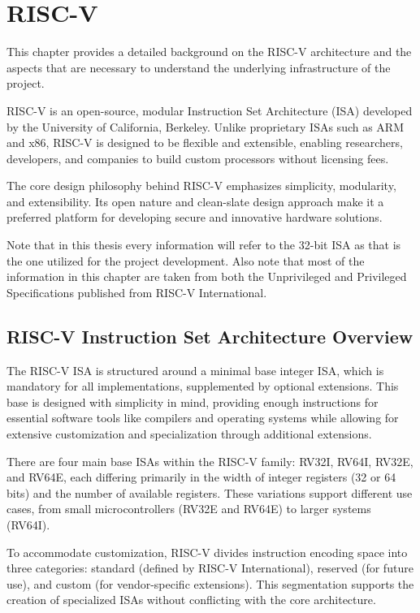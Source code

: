 \chapter{RISC-V}
\label{cha:riscv}

This chapter provides a detailed background on the RISC-V architecture and the
aspects that are necessary to understand the underlying infrastructure of the
project.

RISC-V is an open-source, modular Instruction Set Architecture (ISA) developed by
the University of California, Berkeley\cite{riscv}. Unlike proprietary ISAs such
as ARM and x86, RISC-V is designed to be flexible and extensible, enabling
researchers, developers, and companies to build custom processors without
licensing fees.

The core design philosophy behind RISC-V emphasizes simplicity, modularity, and
extensibility. Its open nature and clean-slate design approach make it a preferred
platform for developing secure and innovative hardware solutions.

Note that in this thesis every information will refer to the 32-bit ISA as that is
the one utilized for the project development. Also note that most of the
information in this chapter are taken from both the Unprivileged and Privileged
Specifications\cite{specifications} published from RISC-V International.

\section{RISC-V Instruction Set Architecture Overview}
\label{sec:riscv_isa}

The RISC-V ISA is structured around a minimal base integer ISA, which is mandatory
for all implementations, supplemented by optional extensions. This base is designed
with simplicity in mind, providing enough instructions for essential software
tools like compilers and operating systems while allowing for extensive
customization and specialization through additional extensions.

There are four main base ISAs within the RISC-V family: RV32I, RV64I, RV32E, and
RV64E, each differing primarily in the width of integer registers (32 or 64 bits)
and the number of available registers. These variations support different use
cases, from small microcontrollers (RV32E and RV64E) to larger systems (RV64I).

To accommodate customization, RISC-V divides instruction encoding space into
three categories: standard (defined by RISC-V International), reserved (for future
use), and custom (for vendor-specific extensions). This segmentation supports
the creation of specialized ISAs without conflicting with the core architecture.

